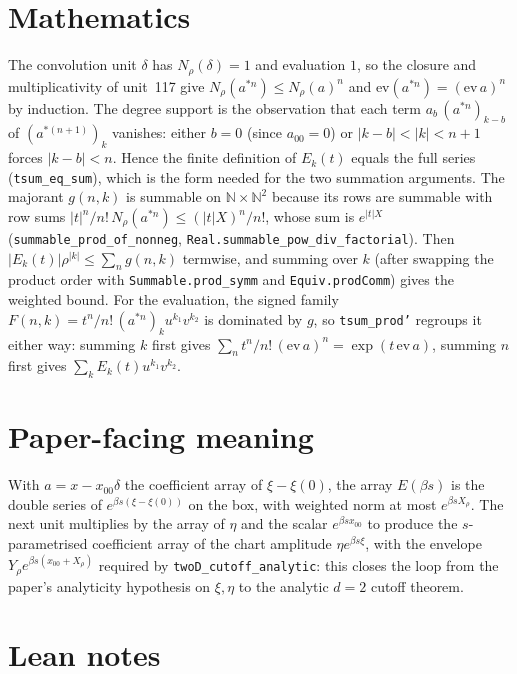 \documentclass[11pt]{article}
\begin{document}
\section{Mathematics}

The convolution unit $\delta$ has $N_\rho(\delta)=1$ and evaluation $1$, so the closure and
multiplicativity of unit~117 give $N_\rho(a^{*n})\le N_\rho(a)^n$ and
$\mathrm{ev}(a^{*n})=(\mathrm{ev}\,a)^n$ by induction. The degree support is the observation that each
term $a_b\,(a^{*n})_{k-b}$ of $(a^{*(n+1)})_k$ vanishes: either $b=0$ (since $a_{00}=0$) or
$|k-b|<|k|<n+1$ forces $|k-b|<n$. Hence the finite definition of $E_k(t)$ equals the full series
(\texttt{tsum\_eq\_sum}), which is the form needed for the two summation arguments. The majorant
$g(n,k)$ is summable on $\mathbb N\times\mathbb N^2$ because its rows are summable with row sums
$|t|^n/n!\,N_\rho(a^{*n})\le(|t|X)^n/n!$, whose sum is $e^{|t|X}$
(\texttt{summable\_prod\_of\_nonneg}, \texttt{Real.summable\_pow\_div\_factorial}). Then
$|E_k(t)|\rho^{|k|}\le\sum_ng(n,k)$ termwise, and summing over $k$ (after swapping the product order
with \texttt{Summable.prod\_symm} and \texttt{Equiv.prodComm}) gives the weighted bound. For the
evaluation, the signed family $F(n,k)=t^n/n!\,(a^{*n})_ku^{k_1}v^{k_2}$ is dominated by $g$, so
\texttt{tsum\_prod'} regroups it either way: summing $k$ first gives
$\sum_nt^n/n!\,(\mathrm{ev}\,a)^n=\exp(t\,\mathrm{ev}\,a)$, summing $n$ first gives
$\sum_kE_k(t)u^{k_1}v^{k_2}$.

\section{Paper-facing meaning}

With $a=x-x_{00}\delta$ the coefficient array of $\xi-\xi(0)$, the array $E(\beta s)$ is the double
series of $e^{\beta s(\xi-\xi(0))}$ on the box, with weighted norm at most $e^{\beta sX_{\rho}}$. The
next unit multiplies by the array of $\eta$ and the scalar $e^{\beta sx_{00}}$ to produce the
$s$-parametrised coefficient array of the chart amplitude $\eta e^{\beta s\xi}$, with the envelope
$Y_\rho e^{\beta s(x_{00}+X_\rho)}$ required by \texttt{twoD\_cutoff\_analytic}: this closes the loop
from the paper's analyticity hypothesis on $\xi,\eta$ to the analytic $d=2$ cutoff theorem.

\section{Lean notes}
\end{document}
